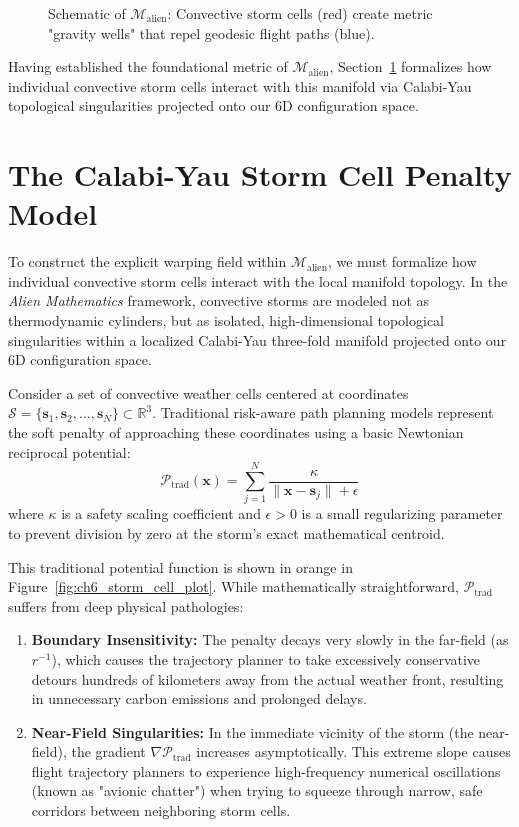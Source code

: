 \documentclass[11pt,a4paper]{book}
\begin{document}
\begin{figure}[htbp]
    \centering
    \caption{Schematic of $\mathcal{M}_{\text{alien}}$: Convective storm cells (red) create metric "gravity wells" that repel geodesic flight paths (blue).}
    \label{fig:alien_manifold}
\end{figure}

Having established the foundational metric of $\mathcal{M}_{\text{alien}}$, Section~\ref{sec:calabi_yau} formalizes how individual convective storm cells interact with this manifold via Calabi-Yau topological singularities projected onto our 6D configuration space.

\section{The Calabi-Yau Storm Cell Penalty Model}
\label{sec:calabi_yau}

To construct the explicit warping field within $\mathcal{M}_{\text{alien}}$, we must formalize how individual convective storm cells interact with the local manifold topology. In the \textit{Alien Mathematics} framework, convective storms are modeled not as thermodynamic cylinders, but as isolated, high-dimensional topological singularities within a localized Calabi-Yau three-fold manifold projected onto our 6D configuration space.

Consider a set of convective weather cells centered at coordinates $\mathcal{S} = \{\mathbf{s}_1, \mathbf{s}_2, \dots, \mathbf{s}_N\} \subset \mathbb{R}^3$. Traditional risk-aware path planning models represent the soft penalty of approaching these coordinates using a basic Newtonian reciprocal potential:
\begin{equation}
\label{eq:penalty_traditional}
\mathcal{P}_{\text{trad}}(\mathbf{x}) = \sum_{j=1}^{N} \frac{\kappa}{\|\mathbf{x} - \mathbf{s}_j\| + \epsilon}
\end{equation}
where $\kappa$ is a safety scaling coefficient and $\epsilon > 0$ is a small regularizing parameter to prevent division by zero at the storm's exact mathematical centroid.

This traditional potential function is shown in orange in Figure~\ref{fig:ch6_storm_cell_plot}. While mathematically straightforward, $\mathcal{P}_{\text{trad}}$ suffers from deep physical pathologies:
\begin{enumerate}
\item \textbf{Boundary Insensitivity:} The penalty decays very slowly in the far-field (as $r^{-1}$), which causes the trajectory planner to take excessively conservative detours hundreds of kilometers away from the actual weather front, resulting in unnecessary carbon emissions and prolonged delays.
\item \textbf{Near-Field Singularities:} In the immediate vicinity of the storm (the near-field), the gradient $\nabla \mathcal{P}_{\text{trad}}$ increases asymptotically. This extreme slope causes flight trajectory planners to experience high-frequency numerical oscillations (known as "avionic chatter") when trying to squeeze through narrow, safe corridors between neighboring storm cells.
\end{enumerate}
\end{document}
